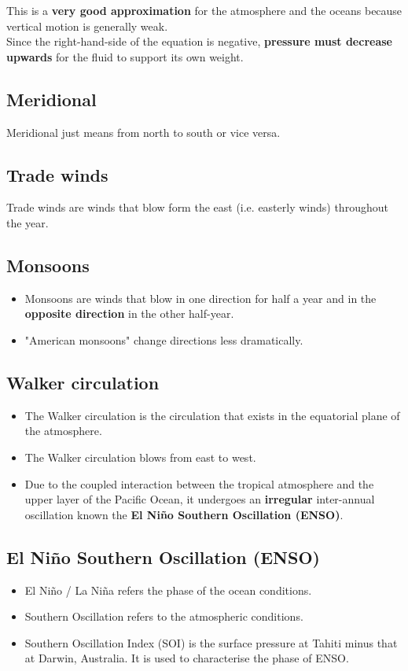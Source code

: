\documentclass[11pt]{article}
\begin{document}
This is a \textbf{very good approximation} for the atmosphere and the oceans because vertical motion is generally weak.
\\[0pt]

Since the right-hand-side of the equation is negative, \textbf{pressure must decrease upwards} for the fluid to support its own weight.

\subsection{Meridional}
\label{sec:org2225eb2}
Meridional just means from north to south or vice versa.

\subsection{Trade winds}
\label{sec:org0f120c4}
Trade winds are winds that blow form the east (i.e. easterly winds) throughout the year.

\subsection{Monsoons}
\label{sec:org984824d}
\begin{itemize}
\item Monsoons are winds that blow in one direction for half a year and in the \textbf{opposite direction} in the other half-year.
\item "American monsoons" change directions less dramatically.
\end{itemize}

\subsection{Walker circulation}
\label{sec:orgaa79489}
\begin{itemize}
\item The Walker circulation is the circulation that exists in the equatorial plane of the atmosphere.
\item The Walker circulation blows from east to west.
\item Due to the coupled interaction between the tropical atmosphere and the upper layer of the Pacific Ocean, it undergoes an \textbf{irregular} inter-annual oscillation known the \textbf{El Niño Southern Oscillation (ENSO)}.
\end{itemize}

\subsection{El Niño Southern Oscillation (ENSO)}
\label{sec:org924e39b}
\begin{itemize}
\item El Niño / La Niña refers the phase of the ocean conditions.
\item Southern Oscillation refers to the atmospheric conditions.
\item Southern Oscillation Index (SOI) is the surface pressure at Tahiti minus that at Darwin, Australia. It is used to characterise the phase of ENSO.
\end{itemize}
\end{document}
